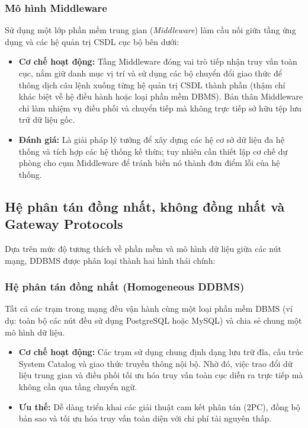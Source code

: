 \documentclass[12pt,a4paper]{report}
\begin{document}
\subsubsection{Mô hình Middleware}
Sử dụng một lớp phần mềm trung gian (\textit{Middleware}) làm cầu nối giữa tầng ứng dụng và các hệ quản trị CSDL cục bộ bên dưới:
\begin{itemize}[leftmargin=0.8cm, topsep=2pt, itemsep=1pt]
    \item \textbf{Cơ chế hoạt động:} Tầng Middleware đóng vai trò tiếp nhận truy vấn toàn cục, nắm giữ danh mục vị trí và sử dụng các bộ chuyển đổi giao thức để thông dịch câu lệnh xuống từng hệ quản trị CSDL thành phần (thậm chí khác biệt về hệ điều hành hoặc loại phần mềm DBMS). Bản thân Middleware chỉ làm nhiệm vụ điều phối và chuyển tiếp mà không trực tiếp sở hữu tệp lưu trữ dữ liệu gốc.
    \item \textbf{Đánh giá:} Là giải pháp lý tưởng để xây dựng các hệ cơ sở dữ liệu đa hệ thống và tích hợp các hệ thống kế thừa; tuy nhiên cần thiết lập cơ chế dự phòng cho cụm Middleware để tránh biến nó thành đơn điểm lỗi của hệ thống.
\end{itemize}

\subsection{Hệ phân tán đồng nhất, không đồng nhất và Gateway Protocols}
Dựa trên mức độ tương thích về phần mềm và mô hình dữ liệu giữa các nút mạng, DDBMS được phân loại thành hai hình thái chính:

\subsubsection{Hệ phân tán đồng nhất (Homogeneous DDBMS)}
Tất cả các trạm trong mạng đều vận hành cùng một loại phần mềm DBMS (ví dụ: toàn bộ các nút đều sử dụng PostgreSQL hoặc MySQL) và chia sẻ chung một mô hình dữ liệu.
\begin{itemize}[leftmargin=0.8cm, topsep=2pt, itemsep=1pt]
    \item \textbf{Cơ chế hoạt động:} Các trạm sử dụng chung định dạng lưu trữ đĩa, cấu trúc System Catalog và giao thức truyền thông nội bộ. Nhờ đó, việc trao đổi dữ liệu trung gian và điều phối tối ưu hóa truy vấn toàn cục diễn ra trực tiếp mà không cần qua tầng chuyển ngữ.
    \item \textbf{Ưu thế:} Dễ dàng triển khai các giải thuật cam kết phân tán (2PC), đồng bộ bản sao và tối ưu hóa truy vấn toàn diện với chi phí tài nguyên thấp.
\end{itemize}
\end{document}
